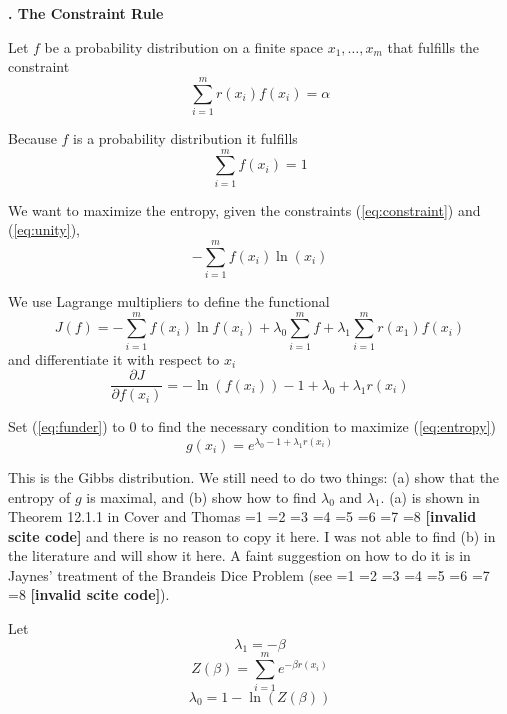 \documentclass[11pt]{article}
\newcommand{\kapt}[1]{\textbf{{\thechap}. #1}\addtocounter{chap}{1}}
\newif\ifNumericalOrYear
\newcommand{\PageP}{p.~}
\newcommand{\PageP}{}
\newcommand{\scite}[3]{\ifnum#1=1\ifNumericalOrYear\citep{#2}\else\citeyearpar{#2}\fi\else
\ifnum#1=2\ifNumericalOrYear\citep[#3]{#2}\else\citep[{\PageP}#3]{#2}\fi\else
\ifnum#1=3\ifNumericalOrYear(\citet[#3]{#2})\else\citep[{\PageP}#3]{#2}\fi\else
\ifnum#1=4\ifNumericalOrYear\citet{#2}\else\citet{#2}\fi\else
\ifnum#1=5\ifNumericalOrYear(\citet{#2})\else\citep{#2}\fi\else
\ifnum#1=6\ifNumericalOrYear(\citet[#3]{#2})\else\citep[{\PageP}#3]{#2}\fi\else
\ifnum#1=7\ifNumericalOrYear\citep{#2}\else\citealp{#2}\fi\else
\ifnum#1=8\ifNumericalOrYear\citep[#3]{#2}\else\citealp[{\PageP}#3]{#2}\fi\else
\textbf{[invalid scite code]}\fi\fi\fi\fi\fi\fi\fi\fi}
\begin{document}
\kapt{The Constraint Rule}

Let $f$ be a probability distribution on a finite space
$x_{1},\ldots,x_{m}$ that fulfills the constraint
\begin{equation}
  \label{eq:constraint}
\sum_{i=1}^{m}r(x_{i})f(x_{i})=\alpha
\end{equation}

Because $f$ is a probability distribution it fulfills
\begin{equation}
  \label{eq:unity}
\sum_{i=1}^{m}f(x_{i})=1
\end{equation}

We want to maximize the entropy, given the constraints
({\ref{eq:constraint}}) and ({\ref{eq:unity}}),
\begin{equation}
  \label{eq:entropy}
-\sum_{i=1}^{m}f(x_{i})\ln(x_{i})
\end{equation}

We use Lagrange multipliers to define the functional
\begin{equation}
  \label{eq:functional}
J(f)=-\sum_{i=1}^{m}f(x_{i})\ln{}f(x_{i})+\lambda_{0}\sum_{i=1}^{m}f+\lambda_{1}\sum_{i=1}^{m}r(x_{1})f(x_{i})
\end{equation}
and differentiate it with respect to $x_{i}$
\begin{equation}
  \label{eq:funder}
\frac{\partial{}J}{\partial{}f(x_{i})}=-\ln(f(x_{i}))-1+\lambda_{0}+\lambda_{1}r(x_{i})
\end{equation}

Set ({\ref{eq:funder}}) to $0$ to find the necessary condition to
maximize ({\ref{eq:entropy}})
\begin{equation}
  \label{eq:coverthomas}
g(x_{i})=e^{\lambda_{0}-1+\lambda_{1}r(x_{i})}
\end{equation}

This is the Gibbs distribution. We still need to do two things: (a)
show that the entropy of $g$ is maximal, and (b) show how to find
$\lambda_{0}$ and $\lambda_{1}$. (a) is shown in Theorem 12.1.1 in
Cover and Thomas \scite{1}{coverthomas06}{} and there is no reason to
copy it here. I was not able to find (b) in the literature and will
show it here. A faint suggestion on how to do it is in Jaynes'
treatment of the Brandeis Dice Problem (see \scite{8}{jaynes89}{243}). 

Let
\begin{equation}
  \label{eq:l1}
\lambda_{1}=-\beta
\end{equation}
\begin{equation}
  \label{eq:zet}
Z(\beta)=\sum_{i=1}^{m}e^{-\beta{}r(x_{i})}
\end{equation}
\begin{equation}
  \label{eq:l0}
\lambda_{0}=1-\ln(Z(\beta))
\end{equation}
\end{document}
